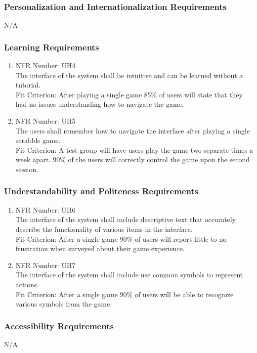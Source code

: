 \documentclass[12pt, titlepage]{article}
\begin{document}
\subsubsection{Personalization and Internationalization Requirements}
N/A
\subsubsection{Learning Requirements}
\begin{enumerate}
    \item NFR Number: UH4\\ %
    The interface of the system shall be intuitive and can be learned without a tutorial.\\
    Fit Criterion: After playing a single game 85\% of users will state that they had no issues understanding how to navigate the game. 
    \item NFR Number: UH5\\ %
    The users shall remember how to navigate the interface after playing a single scrabble game. \\
    Fit Criterion: A test group will have users play the game two separate times a week apart. 90\% of the users will correctly control the game upon the second session. 
\end{enumerate}
\subsubsection{Understandability and Politeness Requirements}
\begin{enumerate}
    \item NFR Number: UH6\\ %
    The interface of the system shall include descriptive text that accurately describe the functionality of various items in the interface.\\
    Fit Criterion: After a single game 90\% of users will report little to no frustration when surveyed about their game experience.
     \item NFR Number: UH7\\ %
    The interface of the system shall include use common symbols to represent actions.\\
    Fit Criterion: After a single game 90\% of users will be able to recognize various symbols from the game.
\end{enumerate}
\subsubsection{Accessibility Requirements}
N/A
\end{document}
